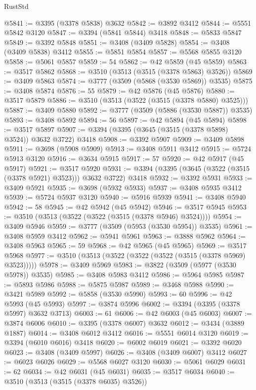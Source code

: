 \begin{lexlean}{RustStd}
\begin{coremodule}
@5841 := @3395 (@3378 @5838) @3632
@5842 := @3892 @3412
@5844 := @5551 @5842 @3120
@5847 := @3394 (@5841 @5844) @3418
@5848 := @5833 @5847
@5849 := @3392 @5848
@5851 := @3408 (@3409 @5828)
@5854 := @3408 (@3409 @5838) @3412
@5855 := @5851 @5854
@5857 := @5568 @5855 @3120
@5858 := @5061 @5857
@5859 := 54
@5862 := @42 @5859 (@45 @5859)
@5863 := @3517 @5862
@5868 := @3510 (@3513 (@3515 (@3378 @5863) @3526))
@5869 := @3409 @5863
@5874 := @3777 (@3509 (@5868 (@3530 @5869)) @3535)
@5875 := @3408 @5874
@5876 := 55
@5879 := @42 @5876 (@45 @5876)
@5880 := @3517 @5879
@5886 := @3510 (@3513 (@3522 (@3515 (@3378 @5880) @3525)))
@5887 := @3409 @5880
@5892 := @3777 (@3509 (@5886 (@3530 @5887)) @3535)
@5893 := @3408 @5892
@5894 := 56
@5897 := @42 @5894 (@45 @5894)
@5898 := @3517 @5897
@5907 := @3394 (@3395 (@3645 (@3515 (@3378 @5898) @3524)) @3632 @3722) @3418
@5908 := @3392 @5907
@5909 := @3409 @5898
@5911 := @3698 (@5908 @5909)
@5913 := @3408 @5911 @3412
@5915 := @5724 @5913 @3120
@5916 := @3634 @5915
@5917 := 57
@5920 := @42 @5917 (@45 @5917)
@5921 := @3517 @5920
@5931 := @3394 (@3395 (@3645 (@3522 (@3515 (@3378 @5921) @3523))) @3632 @3722) @3418
@5932 := @3392 @5931
@5933 := @3409 @5921
@5935 := @3698 (@5932 @5933)
@5937 := @3408 @5935 @3412
@5939 := @5724 @5937 @3120
@5940 := @5916 @5939
@5941 := @3408 @5940
@5942 := 58
@5945 := @42 @5942 (@45 @5942)
@5946 := @3517 @5945
@5953 := @3510 (@3513 (@3522 (@3522 (@3515 (@3378 @5946) @3524))))
@5954 := @3409 @5946
@5959 := @3777 (@3509 (@5953 (@3530 @5954)) @3535)
@5961 := @3408 @5959 @3412
@5962 := @5941 @5961
@5963 := @3888 @5962
@5964 := @3408 @5963
@5965 := 59
@5968 := @42 @5965 (@45 @5965)
@5969 := @3517 @5968
@5977 := @3510 (@3513 (@3522 (@3522 (@3522 (@3515 (@3378 @5969) @3523)))))
@5978 := @3409 @5969
@5983 := @3822 (@3509 (@5977 (@3530 @5978)) @3535)
@5985 := @3408 @5983 @3412
@5986 := @5964 @5985
@5987 := @5893 @5986
@5988 := @5875 @5987
@5989 := @3468 @5988
@5990 := @3421 @5989
@5992 := @5858 (@3530 @5990)
@5993 := 60
@5996 := @42 @5993 (@45 @5993)
@5997 := @3874 @5996
@6002 := @3394 (@3395 (@3378 @5997) @3632 @3713)
@6003 := 61
@6006 := @42 @6003 (@45 @6003)
@6007 := @3874 @6006
@6010 := @3395 (@3378 @6007) @3632
@6012 := @3434 (@3889 @1887)
@6014 := @3408 @6012 @3412
@6016 := @5551 @6014 @3120
@6019 := @3394 (@6010 @6016) @3418
@6020 := @6002 @6019
@6021 := @3392 @6020
@6023 := @3408 (@3409 @5997)
@6026 := @3408 (@3409 @6007) @3412
@6027 := @6023 @6026
@6029 := @5568 @6027 @3120
@6030 := @5061 @6029
@6031 := 62
@6034 := @42 @6031 (@45 @6031)
@6035 := @3517 @6034
@6040 := @3510 (@3513 (@3515 (@3378 @6035) @3526))

\end{coremodule}
\end{lexlean}
